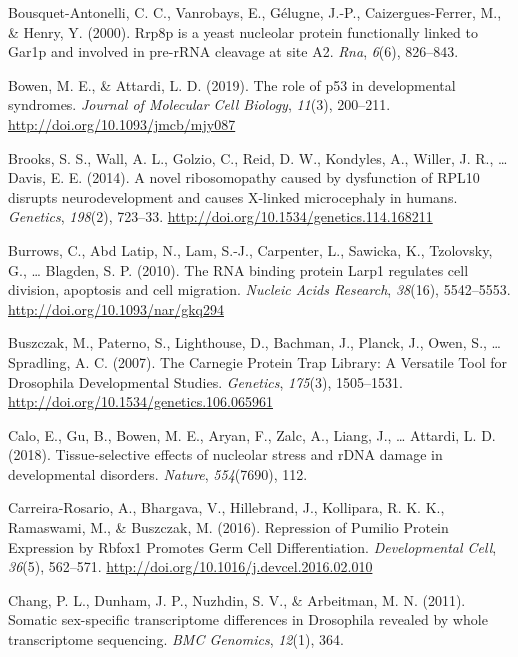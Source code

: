 \documentclass[12pt,twoside]{reedthesis}
\newlength{\cslhangindent}
\newenvironment{cslreferences}%
  {\setlength{\parindent}{0pt}%
  \everypar{\setlength{\hangindent}{\cslhangindent}}\ignorespaces}%
  {\par}
\begin{document}
\begin{cslreferences}
\leavevmode\hypertarget{ref-Bousquet-Antonelli2000a}{}%
Bousquet-Antonelli, C. C., Vanrobays, E., Gélugne, J.-P., Caizergues-Ferrer, M., \& Henry, Y. (2000). Rrp8p is a yeast nucleolar protein functionally linked to Gar1p and involved in pre-rRNA cleavage at site A2. \emph{Rna}, \emph{6}(6), 826--843.

\leavevmode\hypertarget{ref-bowenRoleP53Developmental2019}{}%
Bowen, M. E., \& Attardi, L. D. (2019). The role of p53 in developmental syndromes. \emph{Journal of Molecular Cell Biology}, \emph{11}(3), 200--211. \url{http://doi.org/10.1093/jmcb/mjy087}

\leavevmode\hypertarget{ref-Brooks2014b}{}%
Brooks, S. S., Wall, A. L., Golzio, C., Reid, D. W., Kondyles, A., Willer, J. R., \ldots{} Davis, E. E. (2014). A novel ribosomopathy caused by dysfunction of RPL10 disrupts neurodevelopment and causes X-linked microcephaly in humans. \emph{Genetics}, \emph{198}(2), 723--33. \url{http://doi.org/10.1534/genetics.114.168211}

\leavevmode\hypertarget{ref-burrowsRNABindingProtein2010}{}%
Burrows, C., Abd Latip, N., Lam, S.-J., Carpenter, L., Sawicka, K., Tzolovsky, G., \ldots{} Blagden, S. P. (2010). The RNA binding protein Larp1 regulates cell division, apoptosis and cell migration. \emph{Nucleic Acids Research}, \emph{38}(16), 5542--5553. \url{http://doi.org/10.1093/nar/gkq294}

\leavevmode\hypertarget{ref-buszczakCarnegieProteinTrap2007}{}%
Buszczak, M., Paterno, S., Lighthouse, D., Bachman, J., Planck, J., Owen, S., \ldots{} Spradling, A. C. (2007). The Carnegie Protein Trap Library: A Versatile Tool for Drosophila Developmental Studies. \emph{Genetics}, \emph{175}(3), 1505--1531. \url{http://doi.org/10.1534/genetics.106.065961}

\leavevmode\hypertarget{ref-Calo2018a}{}%
Calo, E., Gu, B., Bowen, M. E., Aryan, F., Zalc, A., Liang, J., \ldots{} Attardi, L. D. (2018). Tissue-selective effects of nucleolar stress and rDNA damage in developmental disorders. \emph{Nature}, \emph{554}(7690), 112.

\leavevmode\hypertarget{ref-Carreira-Rosario2016e}{}%
Carreira-Rosario, A., Bhargava, V., Hillebrand, J., Kollipara, R. K. K., Ramaswami, M., \& Buszczak, M. (2016). Repression of Pumilio Protein Expression by Rbfox1 Promotes Germ Cell Differentiation. \emph{Developmental Cell}, \emph{36}(5), 562--571. \url{http://doi.org/10.1016/j.devcel.2016.02.010}

\leavevmode\hypertarget{ref-Chang2011}{}%
Chang, P. L., Dunham, J. P., Nuzhdin, S. V., \& Arbeitman, M. N. (2011). Somatic sex-specific transcriptome differences in Drosophila revealed by whole transcriptome sequencing. \emph{BMC Genomics}, \emph{12}(1), 364.


\end{cslreferences}
\end{document}
